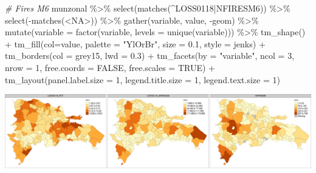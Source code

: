 \documentclass[10pt,landscape,a3paper]{article}
\newenvironment{Shaded}{\begin{snugshade}}{\end{snugshade}}
\newcommand{\AttributeTok}[1]{\textcolor[rgb]{0.77,0.63,0.00}{#1}}
\newcommand{\CommentTok}[1]{\textcolor[rgb]{0.56,0.35,0.01}{\textit{#1}}}
\newcommand{\ConstantTok}[1]{\textcolor[rgb]{0.00,0.00,0.00}{#1}}
\newcommand{\DecValTok}[1]{\textcolor[rgb]{0.00,0.00,0.81}{#1}}
\newcommand{\FloatTok}[1]{\textcolor[rgb]{0.00,0.00,0.81}{#1}}
\newcommand{\FunctionTok}[1]{\textcolor[rgb]{0.00,0.00,0.00}{#1}}
\newcommand{\NormalTok}[1]{#1}
\newcommand{\SpecialCharTok}[1]{\textcolor[rgb]{0.00,0.00,0.00}{#1}}
\newcommand{\StringTok}[1]{\textcolor[rgb]{0.31,0.60,0.02}{#1}}
\begin{document}
\begin{Shaded}
\begin{Highlighting}[]

\CommentTok{\# Fires M6}
\NormalTok{munzonal }\SpecialCharTok{\%\textgreater{}\%} \FunctionTok{select}\NormalTok{(}\FunctionTok{matches}\NormalTok{(}\StringTok{\textquotesingle{}\^{}LOSS0118|NFIRESM6\textquotesingle{}}\NormalTok{)) }\SpecialCharTok{\%\textgreater{}\%} \FunctionTok{select}\NormalTok{(}\SpecialCharTok{{-}}\FunctionTok{matches}\NormalTok{(}\StringTok{\textquotesingle{}\textless{}NA\textgreater{}\textquotesingle{}}\NormalTok{)) }\SpecialCharTok{\%\textgreater{}\%} 
  \FunctionTok{gather}\NormalTok{(variable, value, }\SpecialCharTok{{-}}\NormalTok{geom) }\SpecialCharTok{\%\textgreater{}\%}
  \FunctionTok{mutate}\NormalTok{(}\AttributeTok{variable =} \FunctionTok{factor}\NormalTok{(variable, }\AttributeTok{levels =} \FunctionTok{unique}\NormalTok{(variable))) }\SpecialCharTok{\%\textgreater{}\%} 
  \FunctionTok{tm\_shape}\NormalTok{() }\SpecialCharTok{+}
  \FunctionTok{tm\_fill}\NormalTok{(}\AttributeTok{col=}\StringTok{\textquotesingle{}value\textquotesingle{}}\NormalTok{, }\AttributeTok{palette =} \StringTok{"YlOrBr"}\NormalTok{, }\AttributeTok{size =} \FloatTok{0.1}\NormalTok{, }\AttributeTok{style =} \StringTok{\textquotesingle{}jenks\textquotesingle{}}\NormalTok{) }\SpecialCharTok{+}
  \FunctionTok{tm\_borders}\NormalTok{(}\AttributeTok{col =} \StringTok{\textquotesingle{}grey15\textquotesingle{}}\NormalTok{, }\AttributeTok{lwd =} \FloatTok{0.3}\NormalTok{) }\SpecialCharTok{+}
  \FunctionTok{tm\_facets}\NormalTok{(}\AttributeTok{by =} \StringTok{"variable"}\NormalTok{, }\AttributeTok{ncol =} \DecValTok{3}\NormalTok{, }\AttributeTok{nrow =} \DecValTok{1}\NormalTok{, }\AttributeTok{free.coords =} \ConstantTok{FALSE}\NormalTok{, }\AttributeTok{free.scales =} \ConstantTok{TRUE}\NormalTok{) }\SpecialCharTok{+}
  \FunctionTok{tm\_layout}\NormalTok{(}\AttributeTok{panel.label.size =} \DecValTok{1}\NormalTok{, }\AttributeTok{legend.title.size =} \DecValTok{1}\NormalTok{, }\AttributeTok{legend.text.size =} \DecValTok{1}\NormalTok{)}
\end{Highlighting}
\end{Shaded}

\begin{center}\includegraphics{img/zonal-mun-6} \end{center}
\end{document}
